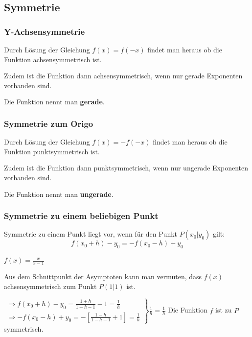 \documentclass[main.tex]{subfiles}
\begin{document}
\subsection{Symmetrie}

\subsubsection{Y-Achsensymmetrie}

Durch Lösung der Gleichung $f(x)=f(-x)$ findet man heraus ob die Funktion achsensymmetrisch ist.

Zudem ist die Funktion dann achsensymmetrisch, wenn nur gerade Exponenten vorhanden sind.

Die Funktion nennt man \textbf{gerade}.


\subsubsection{Symmetrie zum Origo}

Durch Lösung der Gleichung $f(x)=-f(-x)$ findet man heraus ob die Funktion punktsymmetrisch ist.

Zudem ist die Funktion dann punktsymmetrisch, wenn nur ungerade Exponenten vorhanden sind.

Die Funktion nennt man \textbf{ungerade}.


\subsubsection{Symmetrie zu einem beliebigen Punkt}

\begin{Definition}
	Symmetrie zu einem Punkt liegt vor, wenn für den Punkt $P(x_{0}|y_{0})$ gilt:
	$$f(x_{0}+h)-y_{0}=-f(x_{0}-h)+y_{0}$$
\end{Definition}

\begin{Beispiel}
	$f(x)=\frac{x}{x-1}$
	
	Aus dem Schnittpunkt der Asymptoten kann man vermuten, dass $f(x)$ achsensymmetrisch zum Punkt $P(1|1)$ ist.
	
	$\left. \begin{array}{rcl}
		\Rightarrow f(x_{0}+h)-y_{0}=\frac{1+h}{1+h-1}-1=\frac{1}{h}\\
		\Rightarrow -f(x_{0}-h)+y_{0}=-[\frac{1-h}{1-h-1}+1]=\frac{1}{h}
	\end{array} \right\} \frac{1}{h}=\frac{1}{h}$ Die Funktion $f$ ist zu $P$ symmetrisch.
\end{Beispiel}
\end{document}
